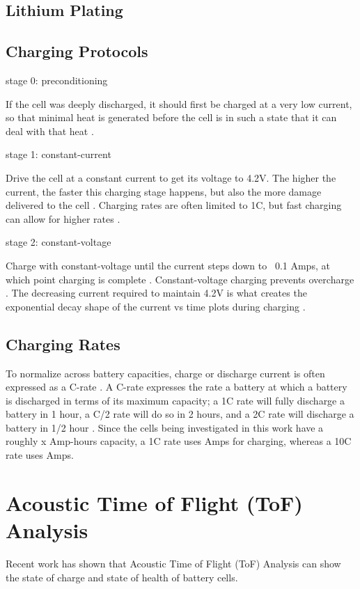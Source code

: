\subsection{Lithium Plating}

\subsection{Charging Protocols}

stage 0: preconditioning

If the cell was deeply discharged, it should first be charged at a very low current, so that minimal heat is generated before the cell is in such a state that it can deal with that heat \cite{DIGIKEY}.

stage 1: constant-current 

Drive the cell at a constant current to get its voltage to 4.2V. The higher the current, the faster this charging stage happens, but also the more damage delivered to the cell \cite{TI}. Charging rates are often limited to 1C, but fast charging can allow for higher rates \cite{TI}.

stage 2: constant-voltage 

Charge with constant-voltage until the current steps down to ~0.1 Amps, at which point charging is complete \cite{DIGIKEY}. Constant-voltage charging prevents overcharge \cite{DIGIKEY}. The decreasing current required to maintain 4.2V is what creates the exponential decay shape of the current vs time plots during charging \cite{TI}.

\subsection{Charging Rates}
To normalize across battery capacities, charge or discharge current is often expressed as a C-rate \cite{SPECS}. A C-rate expresses the rate a battery at which a battery is discharged in terms of its maximum capacity; a 1C rate will fully discharge a battery in 1 hour, a C/2 rate will do so in 2 hours, and a 2C rate will discharge a battery in 1/2 hour \cite{SPECS}. Since the cells being investigated in this work have a roughly x Amp-hours  capacity, a 1C rate uses  Amps for charging, whereas a 10C rate uses  Amps.

\section{Acoustic Time of Flight (ToF) Analysis}
Recent work has shown that Acoustic Time of Flight (ToF) Analysis can show the state of charge and state of health of battery cells.

